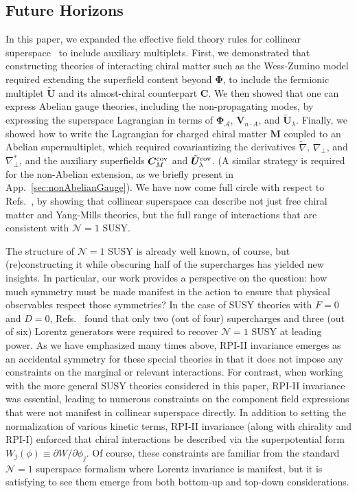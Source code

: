 \documentclass[12pt,document,nofootinbib,superscriptaddress,onecolumn,preprintnumbers,balancelastpage]{article}
\DeclareRobustCommand{\App}[1]{App.~\ref{#1}}
\DeclareRobustCommand{\Refs}[1]{Refs.~\cite{#1}}
\newcommand{\bPhi}{ \boldsymbol \Phi}
\newcommand{\bM}{ \boldsymbol M}
\newcommand{\bC}{ \boldsymbol C}
\newcommand{\bD}{ \boldsymbol{V}_{n \cdot A}}
\newcommand{\bPhialc}{ \boldsymbol{\Phi}_\alc}
\newcommand{\bU}{ \tilde{\boldsymbol U}}
\newcommand{\alc}{\mathcal{A}}
\begin{document}
\begin{spacing}{1.2}
\section{Future Horizons}
\label{sec:Outlook}
In this paper, we expanded the effective field theory rules for collinear superspace~\cite{Cohen:2018qvn} to include auxiliary multiplets.
%
First, we demonstrated that constructing theories of interacting chiral matter such as the Wess-Zumino model required extending the superfield content beyond $ \bPhi$, to include the fermionic multiplet $\bU$ and its almost-chiral counterpart $\bC$.
%
We then showed that one can express Abelian gauge theories, including the non-propagating modes, by expressing the superspace Lagrangian in terms of $\bPhialc$, $\bD$, and $\bU_\lambda$.
%
Finally, we showed how to write the Lagrangian for charged chiral matter $\bM$ coupled to an Abelian supermultiplet, which required covariantizing the derivatives $\tilde{\nabla}$,  $\nabla_\perp$, and $\nabla_\perp^*$, and the auxiliary superfields $\bC^{\rm cov}_M$ and $\bU^{\rm cov}_\lambda$.
%
(A similar strategy is required for the non-Abelian extension, as we briefly present in \App{sec:nonAbelianGauge}).
%
We have now come full circle with respect to \Refs{Cohen:2016jzp,Cohen:2016dcl}, by showing that collinear superspace can describe not just free chiral matter and Yang-Mills theories, but the full range of interactions that are consistent with $\mathcal{N} = 1$ SUSY.


The structure of $\mathcal{N} = 1$ SUSY is already well known, of course, but (re)constructing it while obscuring half of the supercharges has yielded new insights.
%
In particular, our work provides a perspective on the question:  how much symmetry must be made manifest in the action to ensure that physical observables respect those symmetries?
%
In the case of SUSY theories with $F = 0$ and $D = 0$, \Refs{Cohen:2016jzp,Cohen:2016dcl,Cohen:2018qvn} found that only two (out of four) supercharges and three (out of six) Lorentz generators were required to recover $\mathcal{N} = 1$ SUSY at leading power.
%
As we have emphasized many times above, RPI-II invariance emerges as an accidental symmetry for these special theories in that it does not impose any constraints on the marginal or relevant interactions.
%
For contrast, when working with the more general SUSY theories considered in this paper, RPI-II invariance was essential, leading to numerous constraints on the component field expressions that were not manifest in collinear superspace directly.
%
In addition to setting the normalization of various kinetic terms, RPI-II invariance (along with chirality and RPI-I) enforced that chiral interactions be described via the superpotential form $W_j(\phi) \equiv \partial W / \partial \phi_j$.
%
Of course, these constraints are familiar from the standard $\mathcal{N} = 1$ superspace formalism where Lorentz invariance is manifest, but it is satisfying to see them emerge from both bottom-up and top-down considerations.





\end{spacing}
\end{document}
